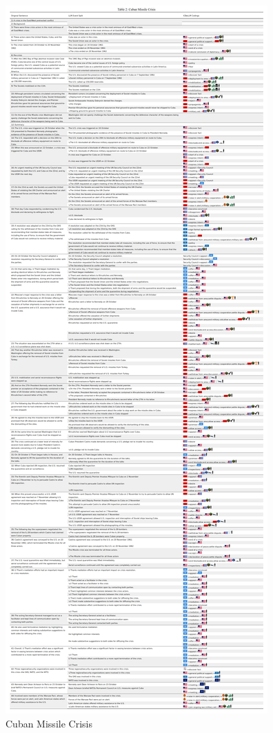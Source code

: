 \documentclass[
  letterpaper,
  DIV=11,
  numbers=noendperiod]{scrartcl}
\begin{document}
\begin{figure}

{\centering \includegraphics{Figure1_Cuban_Missile_Crisis3.png}

}

\caption{Cuban Missile Crisis}

\end{figure}
\end{document}
